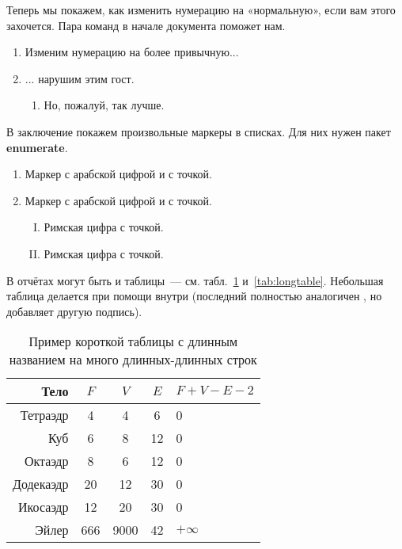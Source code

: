 Теперь мы покажем, как изменить нумерацию на «нормальную», если вам этого захочется. Пара команд в начале документа поможет нам.

\renewcommand{\labelenumi}{\arabic{enumi})}
\renewcommand{\labelenumii}{\asbuk{enumii})}

\begin{enumerate}
\item Изменим нумерацию на более привычную...
\item ... нарушим этим гост.
\begin{enumerate}
\item Но, пожалуй, так лучше.
\end{enumerate}
\end{enumerate}

В заключение покажем произвольные маркеры в списках. Для них нужен пакет \textbf{enumerate}.
\begin{enumerate}[1.]
\item Маркер с арабской цифрой и с точкой.
\item Маркер с арабской цифрой и с точкой.
\begin{enumerate}[I.]
\item Римская цифра с точкой.
\item Римская цифра с точкой.
\end{enumerate}
\end{enumerate}

В отчётах могут быть и таблицы~--- см. табл.~\ref{tab:tabular} и~\ref{tab:longtable}.
Небольшая таблица делается при помощи  внутри  (последний
полностью аналогичен , но добавляет другую подпись).

\begin{table}[ht]
  \caption{Пример короткой таблицы с длинным названием на много длинных-длинных строк}
  \begin{tabular}{|r|c|c|c|l|}
  \hline
  Тело      & $F$ & $V$  & $E$ & $F+V-E-2$ \\
  \hline
  Тетраэдр  & 4   & 4    & 6   & 0         \\
  Куб       & 6   & 8    & 12  & 0         \\
  Октаэдр   & 8   & 6    & 12  & 0         \\
  Додекаэдр & 20  & 12   & 30  & 0         \\
  Икосаэдр  & 12  & 20   & 30  & 0         \\
  \hline
  Эйлер     & 666 & 9000 & 42  & $+\infty$ \\
  \hline
  \end{tabular}
  \label{tab:tabular}
\end{table}


